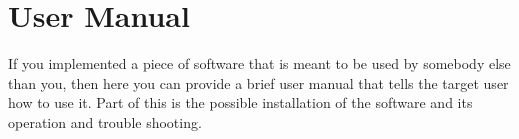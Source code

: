 \chapter{User Manual}
\label{appendiceA}
\thispagestyle{empty}

If you implemented a piece of software that is meant to be used by somebody else than you, then here you can provide a brief user manual that tells the target user how to use it. Part of this is the possible installation of the software and its operation and trouble shooting.